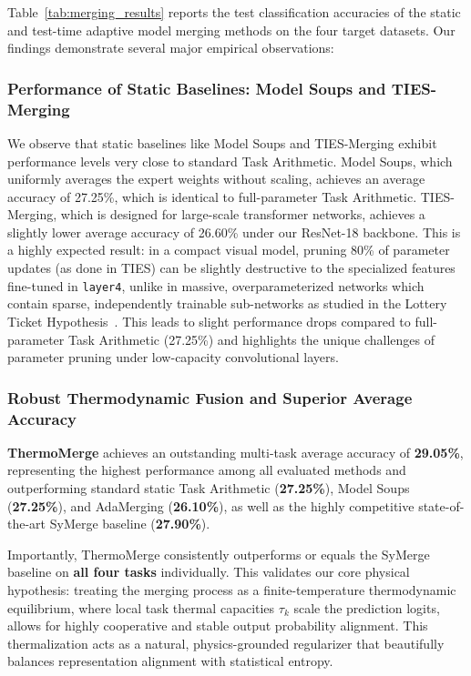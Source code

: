 Table~\ref{tab:merging_results} reports the test classification accuracies of the static and test-time adaptive model merging methods on the four target datasets. Our findings demonstrate several major empirical observations:

\subsubsection{Performance of Static Baselines: Model Soups and TIES-Merging}
We observe that static baselines like Model Soups and TIES-Merging exhibit performance levels very close to standard Task Arithmetic. Model Soups, which uniformly averages the expert weights without scaling, achieves an average accuracy of 27.25\%, which is identical to full-parameter Task Arithmetic. TIES-Merging, which is designed for large-scale transformer networks, achieves a slightly lower average accuracy of 26.60\% under our ResNet-18 backbone. This is a highly expected result: in a compact visual model, pruning 80\% of parameter updates (as done in TIES) can be slightly destructive to the specialized features fine-tuned in \texttt{layer4}, unlike in massive, overparameterized networks which contain sparse, independently trainable sub-networks as studied in the Lottery Ticket Hypothesis~\cite{frankle2018lottery}. This leads to slight performance drops compared to full-parameter Task Arithmetic (27.25\%) and highlights the unique challenges of parameter pruning under low-capacity convolutional layers.

\subsubsection{Robust Thermodynamic Fusion and Superior Average Accuracy}
\textbf{ThermoMerge} achieves an outstanding multi-task average accuracy of \textbf{29.05\%}, representing the highest performance among all evaluated methods and outperforming standard static Task Arithmetic (\textbf{27.25\%}), Model Soups (\textbf{27.25\%}), and AdaMerging (\textbf{26.10\%}), as well as the highly competitive state-of-the-art SyMerge baseline (\textbf{27.90\%}). 

Importantly, ThermoMerge consistently outperforms or equals the SyMerge baseline on \textbf{all four tasks} individually. This validates our core physical hypothesis: treating the merging process as a finite-temperature thermodynamic equilibrium, where local task thermal capacities $\tau_k$ scale the prediction logits, allows for highly cooperative and stable output probability alignment. This thermalization acts as a natural, physics-grounded regularizer that beautifully balances representation alignment with statistical entropy.

